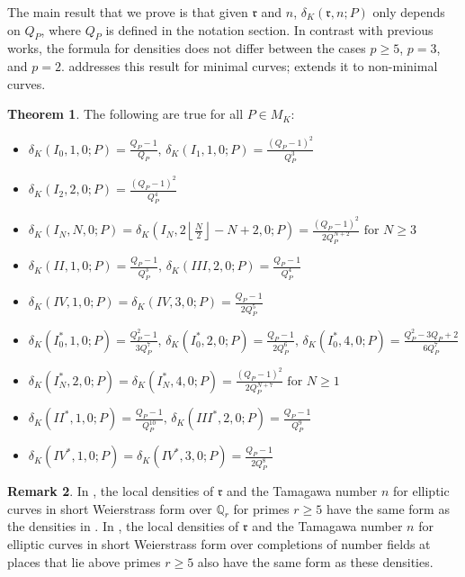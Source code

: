 \documentclass[12pt,letterpaper]{amsart}
\theoremstyle{definition}
\newtheorem{theorem}{Theorem}[section]
\newtheorem{remark}[theorem]{Remark}
\begin{document}
The main result that we prove is that given $\mathfrak{r}$ and $n$, $\delta_K(\mathfrak{r}, n; P)$ only depends on $Q_P$, where $Q_P$ is defined in the notation section. In contrast with previous works, the formula for densities does not differ between the cases $p\geq 5$, $p=3$, and $p=2$.  addresses this result for minimal curves;  extends it to non-minimal curves.

\begin{theorem}
\label{thm:formula}
The following are true for all $P\in M_K$:
\begin{itemize}
\item $\delta_K(I_0, 1, 0; P) = \frac{Q_P-1}{Q_P},\,\delta_K(I_1, 1, 0; P) = \frac{(Q_P-1)^2}{Q_P^3}$
\item $\delta_K(I_2, 2, 0; P) = \frac{(Q_P-1)^2}{Q_P^4}$
\item $\delta_K(I_N, N, 0; P) = \delta_K\left(I_N, 2\left\lfloor \frac{N}{2}\right\rfloor - N + 2, 0; P\right) = \frac{(Q_P-1)^2}{2Q_P^{N+2}} \text{ for } N\geq 3$
\item $\delta_K(II, 1, 0; P) = \frac{Q_P-1}{Q_P^3},\,\delta_K(III, 2, 0; P) = \frac{Q_P-1}{Q_P^4}$
\item $\delta_K(IV, 1, 0; P) = \delta_K(IV, 3, 0; P) = \frac{Q_P-1}{2Q_P^5}$
\item $\delta_K(I_0^*, 1, 0; P) = \frac{Q_P^2-1}{3Q_P^7}, \,\delta_K(I_0^*, 2, 0; P) = \frac{Q_P-1}{2Q_P^6},\,\delta_K(I_0^*, 4, 0; P) = \frac{Q_P^2-3Q_P+2}{6Q_P^7}$
\item $\delta_K(I_N^*, 2, 0; P) = \delta_K(I_N^*, 4, 0; P) =\frac{(Q_P-1)^2}{2Q_P^{N+7}} \text{ for } N\geq 1$
\item $\delta_K(II^*, 1, 0; P) = \frac{Q_P-1}{Q_P^{10}},\,\delta_K(III^*, 2, 0; P) = \frac{Q_P-1}{Q_P^9}$
\item $\delta_K(IV^*, 1, 0; P) = \delta_K(IV^*, 3, 0; P) = \frac{Q_P-1}{2Q_P^8}$
\end{itemize}
\end{theorem}

\begin{remark}
In \cite{ProdRationals}, the local densities of $\mathfrak{r}$ and the Tamagawa number $n$ for elliptic curves in short Weierstrass form over $\mathbb{Q}_r$ for primes $r\geq 5$ have the same form as the densities in . In \cite{ProdNF}, the local densities of $\mathfrak{r}$ and the Tamagawa number $n$ for elliptic curves in short Weierstrass form over completions of number fields at places that lie above primes $r\geq 5$ also have the same form as these densities.
\end{remark}
\end{document}
